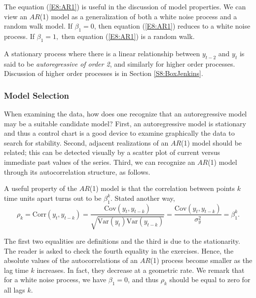
The equation (\ref{E8:AR1}) is useful in the discussion of model
properties. We can view an $AR$(1) model as a generalization of both
a white noise process and a random walk model. If $\beta_1=0$, then
equation (\ref{E8:AR1}) reduces to a white noise process. If
$\beta_1 = 1,$ then equation (\ref{E8:AR1}) is a random walk.

A stationary process where there is a linear relationship between
$y_{t-2}$ and $y_t$ is said to be \emph{autoregressive of order 2},
and similarly for higher order processes. Discussion of higher order
processes is in Section \ref{S8:BoxJenkins}.

\subsubsection*{Model Selection}

When examining the data, how does one recognize that an
autoregressive model may be a suitable candidate model? First, an
autoregressive model is stationary and thus a control chart is a
good device to examine graphically the data to search for stability.
Second, adjacent realizations of an $AR$(1) model should be related;
this can be detected visually by a scatter plot of current versus
immediate past values of the series. Third, we can recognize an
$AR$(1) model through its autocorrelation structure, as follows.

A useful property of the $AR$(1) model is that the correlation
between points $k$ time units apart turns out to be $\beta_1^{k}$.
Stated another way,
\begin{equation}\label{E8:AR1Autocorrelations}
\rho_k = \mathrm{Corr}(y_t,y_{t-k}) =
\frac{\mathrm{Cov}(y_t,y_{t-k})}{\sqrt{\mathrm{Var}(y_t)\mathrm{Var}(y_{t-k})}}
= \frac{\mathrm{Cov}(y_t,y_{t-k})}{\sigma_y^2} = \beta_1^k.
\end{equation}


\noindent The first two equalities are definitions and the third is
due to the stationarity. The reader is asked to check the fourth
equality in the exercises. Hence, the absolute values of the
autocorrelations of an $AR$(1) process become smaller as the lag
time $k$ increases. In fact, they decrease at a geometric rate. We
remark that for a white noise process, we have $\beta_1 = 0$, and
thus $\rho_k$ should be equal to zero for all lags $k$.

